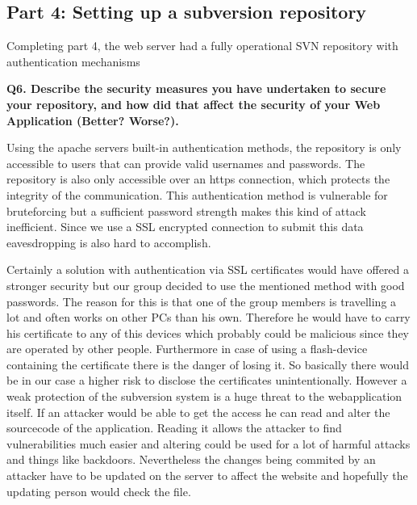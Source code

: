 \subsection {Part 4: Setting up a subversion repository}
Completing part 4, the web server had a fully operational SVN repository with authentication mechanisms
\newline

\noindent
{\bf Q6. Describe the security measures you have undertaken to secure your
repository, and how did that affect the security of your Web Application
(Better? Worse?).}
\newline

\noindent
Using the apache servers built-in authentication methods, the repository is only accessible to users that can provide valid usernames and passwords. The repository is also only accessible over an https connection, which protects the integrity of the communication. This authentication method is vulnerable for bruteforcing but a sufficient password strength makes this kind of attack inefficient. Since we use a SSL encrypted connection to submit this data eavesdropping is also hard to accomplish.
\newline

\noindent
Certainly a solution with authentication via SSL certificates would have offered a stronger security but our group decided to use the mentioned method with good passwords. The reason for this is that one of the group members is travelling a lot and often works on other PCs than his own. Therefore he would have to carry his certificate to any of this devices which probably could be malicious since they are operated by other people. Furthermore in case of using a flash-device containing the certificate there is the danger of losing it.
So basically there would be in our case a higher risk to disclose the certificates unintentionally.
However a weak protection of the subversion system is a huge threat to the webapplication itself. If an attacker would be able to get the access he can read and alter the sourcecode of the application. Reading it allows the attacker to find vulnerabilities much easier and altering could be used for a lot of harmful attacks and things like backdoors. Nevertheless the changes being commited by an attacker have to be updated on the server to affect the website and hopefully the updating person would check the file.


